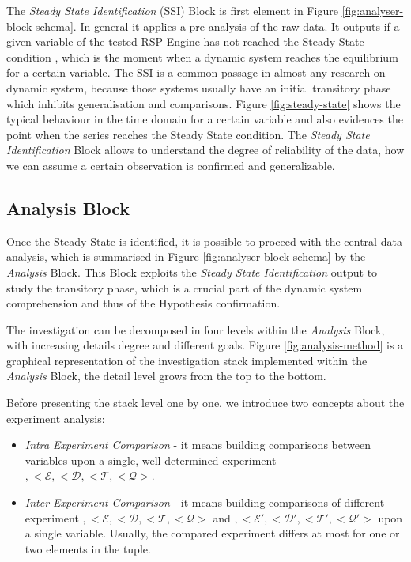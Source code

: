 The \textit{Steady State Identification} (SSI) Block is first element in Figure \ref{fig:analyser-block-schema}. In general it applies a pre-analysis of the raw data. It outputs if a given variable of the tested RSP Engine has not reached the Steady State condition , which is the moment when a dynamic system reaches the equilibrium for a certain variable. The SSI is a common passage in almost any research on dynamic system, because those systems usually have an initial transitory phase which inhibits generalisation and comparisons. Figure \ref{fig:steady-state} shows the typical behaviour in the time domain for a certain variable and also evidences the point when the series reaches the Steady State condition. The \textit{Steady State Identification} Block allows to understand the degree of reliability of the data, how we can assume a certain observation is confirmed and generalizable. %


\subsection{Analysis Block}\label{sec:analyser-analysis-block}

Once the Steady State is identified, it is possible to proceed with the central data analysis, which is summarised in Figure \ref{fig:analyser-block-schema} by the \textit{Analysis} Block. This Block exploits the \textit{Steady State Identification} output to study the transitory phase, which is a crucial part of the dynamic system comprehension and thus of the Hypothesis confirmation.

The investigation can be decomposed in four levels within the \textit{Analysis} Block, with increasing details degree and different goals.  Figure \ref{fig:analysis-method} is a graphical representation of the investigation stack implemented within the \textit{Analysis} Block, the detail level grows from the top to the bottom.

Before presenting the stack level one by one, we introduce two concepts about the experiment analysis:
\begin{itemize}
\item \textit{Intra Experiment Comparison} -  it means building comparisons between variables upon a single, well-determined experiment $,<\mathcal{E},<\mathcal{D},<\mathcal{T},<\mathcal{Q}>$.
\item \textit{Inter Experiment Comparison} -  it means building comparisons of different experiment 
$,<\mathcal{E},<\mathcal{D},<\mathcal{T},<\mathcal{Q}>$ and $,<\mathcal{E}',<\mathcal{D}',<\mathcal{T}',<\mathcal{Q}'>$ upon a single variable. Usually, the compared experiment differs at most for one or two elements in the tuple. 
\end{itemize}


